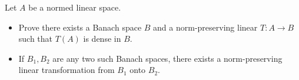 Let $A$ be a normed linear space.
\begin{itemize}
\item[(a)] Prove there exists a Banach space $B$ and a norm-preserving linear $T: A \to B$ such that $T(A)$ is dense in $B$.
\item[(b)] If $B_1, B_2$ are any two such Banach spaces, there exists a norm-preserving linear transformation from $B_1$ onto $B_2$.
\end{itemize}

